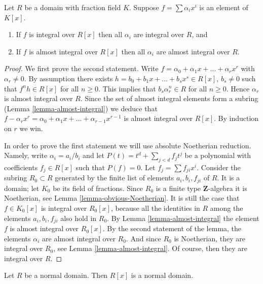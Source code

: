\begin{lemma}
\label{lemma-prepare-polynomial-ring-normal}
Let $R$ be a domain with fraction field $K$.
Suppose $f = \sum \alpha_i x^i$ is an
element of $K[x]$.
\begin{enumerate}
\item If $f$ is integral over $R[x]$
then all $\alpha_i$ are integral over $R$, and
\item If $f$ is almost integral over $R[x]$
then all $\alpha_i$ are almost integral over $R$.
\end{enumerate}
\end{lemma}

\begin{proof}
We first prove the second statement.
Write $f = \alpha_0 + \alpha_1 x + \ldots + \alpha_r x^r$
with $\alpha_r \not = 0$.
By assumption there exists $h = b_0 + b_1 x + \ldots + b_s x^s \in R[x]$,
$b_s \not = 0$ such that $f^n h \in R[x]$ for all
$n \geq 0$. This implies that $b_s \alpha_r^n \in R$
for all $n \geq 0$. Hence $\alpha_r$ is almost
integral over $R$. Since the set of almost integral
elements form a subring (Lemma \ref{lemma-almost-integral}) we deduce that
$f - \alpha_r x^r = \alpha_0 + \alpha_1 x + \ldots + \alpha_{r - 1} x^{r - 1}$
is almost integral over $R[x]$. By induction on $r$ we win.

\medskip\noindent
In order to prove the first statement we will use absolute Noetherian
reduction. Namely, write $\alpha_i = a_i / b_i$ and
let $P(t) = t^d + \sum_{j < d} f_j t^j$ be a polynomial
with coefficients $f_j \in R[x]$ such that $P(f) = 0$.
Let $f_j = \sum f_{ji}x^i$. Consider the subring
$R_0 \subset R$ generated by the finite list of elements
$a_i, b_i, f_{ji}$ of $R$. It is a domain; let
$K_0$ be its field of fractions. Since $R_0$ is a finite type
$\mathbf{Z}$-algebra it is Noetherian, see
Lemma \ref{lemma-obvious-Noetherian}. It is still
the case that $f \in K_0[x]$ is integral over $R_0[x]$,
because all the identities in $R$
among the elements $a_i, b_i, f_{ji}$ also hold in $R_0$.
By Lemma \ref{lemma-almost-integral} the element
$f$ is almost integral over $R_0[x]$. By the second statement of
the lemma, the elements $\alpha_i$ are almost integral
over $R_0$. And since $R_0$ is Noetherian, they are
integral over $R_0$, see Lemma \ref{lemma-almost-integral}.
Of course, then they are integral over $R$.
\end{proof}

\begin{lemma}
\label{lemma-polynomial-domain-normal}
Let $R$ be a normal domain.
Then $R[x]$ is a normal domain.
\end{lemma}

